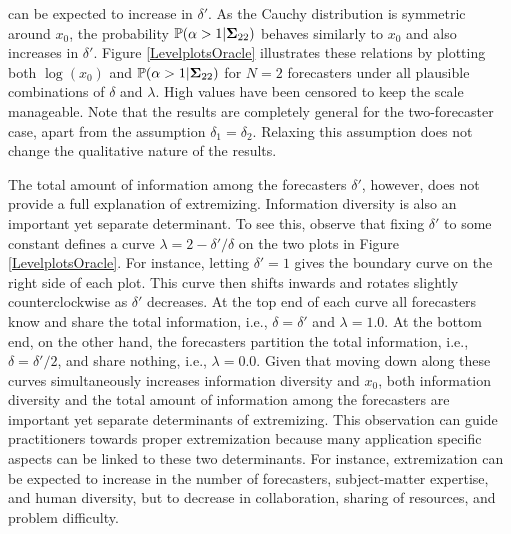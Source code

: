 \documentclass[12pt]{article}
\renewcommand{\P}{\mathbb{P}}
\theoremstyle{definition}
\theoremstyle{definition}
\def\P{{\mathbb P}}
\begin{document}
can be expected to increase in $\delta'$.  As the Cauchy distribution is symmetric around $x_0$, the probability $\P(\alpha > 1 | {\bf\Sigma}_{22})$ behaves similarly to $x_0$ and also increases in $\delta'$.  
Figure \ref{LevelplotsOracle} illustrates these relations by plotting both $\log(x_0)$ and $\P(\alpha > 1 | {\bf\Sigma}_{22})$ for $N = 2$ forecasters under all plausible combinations of $\delta$ and $\lambda$. High values have been censored to keep the scale manageable. Note that the results are completely general for the two-forecaster case, apart from the assumption $\delta_1 = \delta_2$. Relaxing this assumption does not change the qualitative nature of the results.



The total amount of information among the forecasters $\delta'$, however, does not provide a full
explanation of extremizing.  Information diversity is also an
important yet separate determinant.  To see this, observe that fixing $\delta'$ to
some constant defines a curve $\lambda = 2 - \delta'/\delta$ on the two plots in  Figure \ref{LevelplotsOracle}. For
instance, letting $\delta' = 1$ gives the boundary curve on the right
side of each plot.  This curve then shifts inwards and rotates slightly
counterclockwise as $\delta'$ decreases.  At the top end of each curve
all forecasters know and share the total information, i.e., $\delta =
\delta'$ and $\lambda = 1.0$.  At the bottom end, on the other hand,
the forecasters partition the total information, i.e., $\delta =
\delta'/2$, and share nothing, i.e., $\lambda = 0.0$.  Given that
moving down along these curves simultaneously increases information diversity and
$x_0$, both information diversity and the total amount of
information among the forecasters are important yet separate determinants of  extremizing. This observation can guide practitioners towards proper extremization because  many  application specific aspects can be linked to these two determinants. For instance, extremization can be
expected to increase in the number of forecasters,
subject-matter expertise, and human diversity, but to decrease in
collaboration, sharing of resources, and problem difficulty.
 
\end{document}
